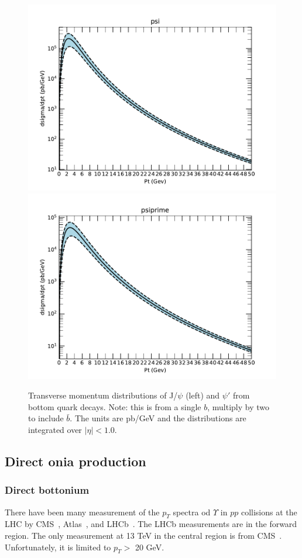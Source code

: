 \documentclass[12pt]{article}
\begin{document}
\begin{figure}
  \includegraphics[width=0.48\linewidth]{../oniaFromB/run2/psi.pdf}
  \includegraphics[width=0.48\linewidth]{../oniaFromB/run2/psiprime.pdf}
  \caption{Transverse momentum distributions of J/$\psi$ (left) 
and $\psi'$ from bottom quark decays. Note: this is from a single $b$, 
multiply by two to include $\bar{b}$. The units are pb/GeV and the 
distributions 
are integrated over $|\eta|<1.0$.}
  \label{fig:bpsi}
\end{figure}

  
\subsection{Direct onia production}
\label{sec:onia}

\subsubsection{Direct bottonium}
\label{sec:upsilon}

There have been many measurement of the $p_T$ spectra od $\Upsilon$ in $pp$ collisions
at the LHC by CMS~\cite{Khachatryan:2010zg, Chatrchyan:2013yna, Khachatryan:2015qpa, Sirunyan:2017qdw},
Atlas~\cite{Aad:2011xv, Aad:2012dlq},
  and LHCb~\cite{Aaij:2018pfp, Aaij:2015awa, Aaij:2014nwa, Aaij:2013yaa, LHCb:2012aa}.
  The LHCb measurements are in the forward region.  The only measurement at 13 TeV
  in the central region is from CMS~\cite{Sirunyan:2017qdw}.  Unfortunately, it is limited
  to $p_T >$ 20 GeV.
\end{document}
